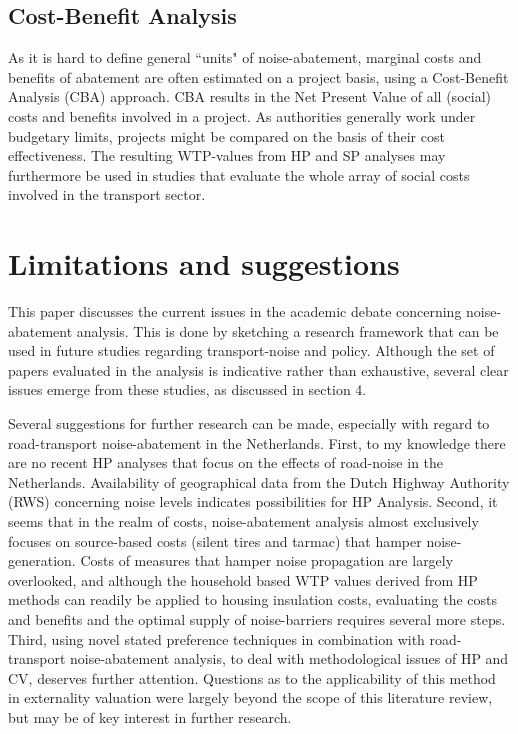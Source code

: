 \documentclass[a4paper]{scrartcl}
\begin{document}
\subsection{Cost-Benefit Analysis}

As it is hard to define general ``units" of noise-abatement, marginal costs and benefits of abatement are often estimated on a project basis, using a Cost-Benefit Analysis (CBA) approach. CBA results in the Net Present Value of all (social) costs and benefits involved in a project. As authorities generally work under budgetary limits, projects might be compared on the basis of their cost effectiveness. The resulting WTP-values from HP and SP analyses may furthermore be used in studies that evaluate the whole array of social costs involved in the transport sector.

\section{Limitations and suggestions}

This paper discusses the current issues in the academic debate concerning noise-abatement analysis. This is done by sketching a research framework that can be used in future studies regarding transport-noise and policy. Although the set of papers evaluated in the analysis is indicative rather than exhaustive, several clear issues emerge from these studies, as discussed in section 4.

Several suggestions for further research can be made, especially with regard to road-transport noise-abatement in the Netherlands. First, to my knowledge there are no recent HP analyses that focus on the effects of road-noise in the Netherlands. Availability of geographical data from the Dutch Highway Authority (RWS) concerning noise levels indicates possibilities for HP Analysis. Second, it seems that in the realm of costs, noise-abatement analysis almost exclusively focuses on source-based costs (silent tires and tarmac) that hamper noise-generation. Costs of measures that hamper noise propagation are largely overlooked, and although the household based WTP values derived from HP methods can readily be applied to housing insulation costs, evaluating the costs and benefits and the optimal supply of noise-barriers requires several more steps. Third, using novel stated preference techniques in combination with road-transport noise-abatement analysis, to deal with methodological issues of HP and CV, deserves further attention. Questions as to the applicability of this method in externality valuation were largely beyond the scope of this literature review, but may be of key interest in further research. 



\end{document}
